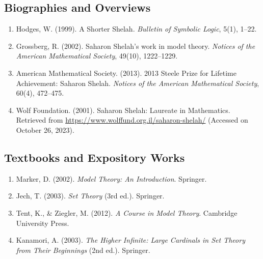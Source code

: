 \subsection*{Biographies and Overviews}
\begin{enumerate}
    \item Hodges, W. (1999). A Shorter Shelah. \textit{Bulletin of Symbolic Logic}, 5(1), 1--22.
    \item Grossberg, R. (2002). Saharon Shelah's work in model theory. \textit{Notices of the American Mathematical Society}, 49(10), 1222--1229.
    \item American Mathematical Society. (2013). 2013 Steele Prize for Lifetime Achievement: Saharon Shelah. \textit{Notices of the American Mathematical Society}, 60(4), 472--475.
    \item Wolf Foundation. (2001). Saharon Shelah: Laureate in Mathematics. Retrieved from \url{https://www.wolffund.org.il/saharon-shelah/} (Accessed on October 26, 2023).
\end{enumerate}

\subsection*{Textbooks and Expository Works}
\begin{enumerate}
    \item Marker, D. (2002). \textit{Model Theory: An Introduction}. Springer.
    \item Jech, T. (2003). \textit{Set Theory} (3rd ed.). Springer.
    \item Tent, K., \& Ziegler, M. (2012). \textit{A Course in Model Theory}. Cambridge University Press.
    \item Kanamori, A. (2003). \textit{The Higher Infinite: Large Cardinals in Set Theory from Their Beginnings} (2nd ed.). Springer.
\end{enumerate}
